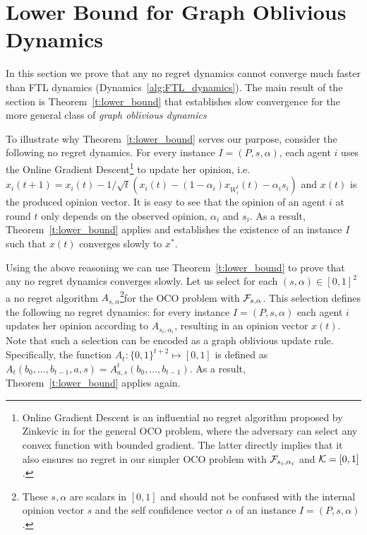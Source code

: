 \section{Lower Bound for Graph Oblivious Dynamics}\label{s:lower_bound}
In this section we prove that any no regret dynamics cannot converge much
faster than FTL dynamics (Dynamics~\ref{alg:FTL_dynamics}). %
The main result of the section is Theorem~\ref{t:lower_bound}
that establishes slow convergence for the more general class of
\emph{graph oblivious dynamics}

To illustrate why Theorem~\ref{t:lower_bound} serves our purpose, consider the
following no regret dynamics. For every instance $I=(P,s,\alpha)$, each agent $i$ uses
the Online Gradient Descent\footnote{
Online Gradient Descent is an influential no regret algorithm 
proposed by Zinkevic in \cite{Z03} for the general OCO problem, where
the adversary can select any convex function with bounded gradient. The latter
directly implies that it also ensures no regret in our simpler 
OCO problem with $\mathcal{F}_{s_i,\alpha_i}$ and $\mathcal{K}=[0,1]$.}
to update her opinion,
i.e. $x_i(t+1)= x_i(t) - 1/\sqrt{t}(x_i(t)-(1-\alpha_i)x_{W_i^t}(t)-\alpha_is_i)$
and $x(t)$ is the produced opinion vector. It is easy to see that the
opinion of an agent $i$ at round $t$ only depends on the observed opinion,
$\alpha_i$ and $s_i$.  As a result, Theorem~\ref{t:lower_bound} applies
and establishes the existence of an instance $I$ such that $x(t)$ 
converges slowly to $x^*$.

Using the above reasoning we can use Theorem~\ref{t:lower_bound}
to prove that any no regret dynamics converges slowly.
Let us select for each $(s,\alpha) \in [0,1]^2$ a
no regret algorithm
$A_{s,\alpha}$\footnote{
These $s,\alpha$ are scalars in $[0,1]$ and
should not be confused with the internal opinion vector $s$
and the self confidence vector $\alpha$ of an instance $I=(P,s,\alpha)$.}for the OCO problem with
$\mathcal{F}_{s,\alpha}$. This selection defines the following no regret dynamics: 
for every instance $I=(P,s,\alpha)$ each agent $i$ updates her
opinion according to $A_{s_i,\alpha_i}$,
resulting in an opinion vector $x(t)$.
Note that such a selection can be encoded as a graph oblivious update rule.
Specifically, the function $A_t:\{0,1\}^{t+2} \mapsto [0,1]$ is defined
as $A_t(b_0,\ldots,b_{t-1},a,s) = A^t_{a,s}(b_0,\ldots,b_{t-1})$.
As a result, Theorem~\ref{t:lower_bound} applies again.

